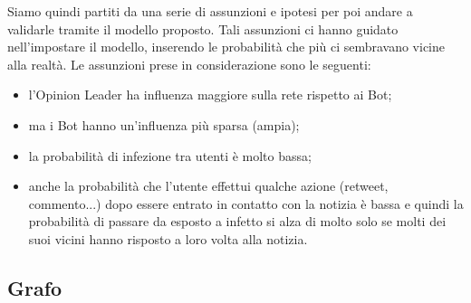 Siamo quindi partiti da una serie di assunzioni e ipotesi per poi andare a validarle tramite il modello proposto. Tali assunzioni ci hanno guidato nell’impostare il modello, inserendo le probabilità che più ci sembravano vicine alla realtà. Le assunzioni prese in considerazione sono le seguenti:
\begin{itemize}
\item l'Opinion Leader ha influenza maggiore sulla rete rispetto ai Bot;
\item ma i Bot hanno un'influenza più sparsa (ampia);
\item la probabilità di infezione tra utenti è molto bassa;
\item anche la probabilità che l’utente effettui qualche azione (retweet, commento...) dopo essere entrato in contatto con la notizia è bassa e quindi la probabilità di passare da esposto a infetto si alza di molto solo se molti dei suoi vicini hanno risposto a loro volta alla notizia.
\end{itemize}
    \subsection{Grafo}
        
